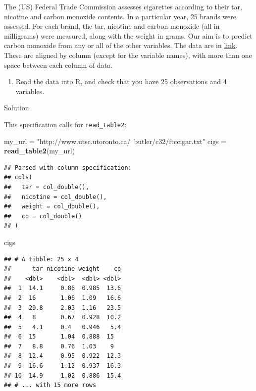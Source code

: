 \documentclass[]{tufte-book}
\newenvironment{Shaded}{}{}
\newcommand{\KeywordTok}[1]{\textcolor[rgb]{0.00,0.44,0.13}{\textbf{#1}}}
\newcommand{\NormalTok}[1]{#1}
\newcommand{\StringTok}[1]{\textcolor[rgb]{0.25,0.44,0.63}{#1}}
\providecommand{\tightlist}{%
  \setlength{\itemsep}{0pt}\setlength{\parskip}{0pt}}
\theoremstyle{definition}
\theoremstyle{definition}
\theoremstyle{definition}
\theoremstyle{remark}
\begin{document}
The (US) Federal Trade Commission assesses cigarettes according to their
tar, nicotine and carbon monoxide contents. In a particular year, 25
brands were assessed. For each brand, the tar, nicotine and carbon
monoxide (all in milligrams) were measured, along with the weight in
grams. Our aim is to predict carbon monoxide from any or all of the
other variables. The data are in
\href{http://www.utsc.utoronto.ca/~butler/c32/ftccigar.txt}{link}. These
are aligned by column (except for the variable names), with more than
one space between each column of data.

\begin{enumerate}
\def\labelenumi{(\alph{enumi})}
\tightlist
\item
  Read the data into R, and check that you have 25 observations and 4
  variables.
\end{enumerate}

Solution

This specification calls for \texttt{read\_table2}:

\begin{Shaded}
\begin{Highlighting}[]
\NormalTok{my_url =}\StringTok{ "http://www.utsc.utoronto.ca/~butler/c32/ftccigar.txt"}
\NormalTok{cigs =}\StringTok{ }\KeywordTok{read_table2}\NormalTok{(my_url)}
\end{Highlighting}
\end{Shaded}

\begin{verbatim}
## Parsed with column specification:
## cols(
##   tar = col_double(),
##   nicotine = col_double(),
##   weight = col_double(),
##   co = col_double()
## )
\end{verbatim}

\begin{Shaded}
\begin{Highlighting}[]
\NormalTok{cigs}
\end{Highlighting}
\end{Shaded}

\begin{verbatim}
## # A tibble: 25 x 4
##      tar nicotine weight    co
##    <dbl>    <dbl>  <dbl> <dbl>
##  1  14.1     0.86  0.985  13.6
##  2  16       1.06  1.09   16.6
##  3  29.8     2.03  1.16   23.5
##  4   8       0.67  0.928  10.2
##  5   4.1     0.4   0.946   5.4
##  6  15       1.04  0.888  15  
##  7   8.8     0.76  1.03    9  
##  8  12.4     0.95  0.922  12.3
##  9  16.6     1.12  0.937  16.3
## 10  14.9     1.02  0.886  15.4
## # ... with 15 more rows
\end{verbatim}
\end{document}
